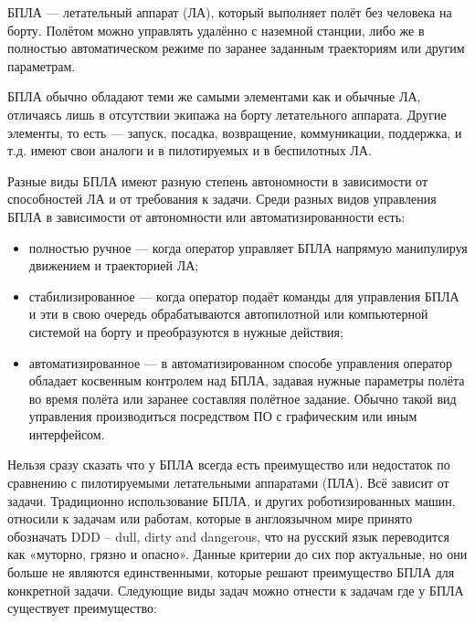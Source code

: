 \documentclass[specification,annotation]{itmo-student-thesis}
\begin{document}
БПЛА --- летательный аппарат (ЛА), который выполняет полёт без человека на борту.
Полётом можно управлять удалённо с наземной станции, либо же в полностью
автоматическом режиме по заранее заданным траекториям или другим
параметрам.\cite{austin-uas}

БПЛА обычно обладают теми же самыми элементами как и обычные ЛА, отличаясь лишь
в отсутствии экипажа на борту летательного аппарата. Другие элементы, то есть ---
запуск, посадка, возвращение, коммуникации, поддержка, и т.д. имеют свои аналоги
и в пилотируемых и в беспилотных ЛА.

Разные виды БПЛА имеют разную степень автономности в зависимости от способностей
ЛА и от требования к задачи. Среди разных видов управления БПЛА в зависимости от
автономности или автоматизированности есть\cite{douglas-intro-to-uas}:

\begin{itemize}
  \item полностью ручное --- когда оператор управляет БПЛА напрямую манипулируя
    движением и траекторией ЛА;
  \item стабилизированное --- когда оператор подаёт команды для управления БПЛА и
    эти в свою очередь обрабатываются автопилотной или компьютерной системой на
    борту и преобразуются в нужные действия;
  \item автоматизированное --- в автоматизированном способе управления оператор
    обладает косвенным контролем над БПЛА, задавая нужные параметры полёта во
    время полёта или заранее составляя полётное задание. Обычно такой вид
    управления производиться посредством ПО с графическим или иным интерфейсом.
\end{itemize}

Нельзя сразу сказать что у БПЛА всегда есть преимущество или недостаток по
сравнению с пилотируемыми летательными аппаратами (ПЛА). Всё зависит от задачи.
Традиционно использование БПЛА, и других роботизированных машин, относили к
задачам или работам, которые в англоязычном мире принято обозначать DDD -- dull,
dirty and dangerous, что на русский язык переводится как «муторно, грязно и
опасно». Данные критерии до сих пор актуальные, но они больше не являются
единственными, которые решают преимущество БПЛА для конкретной задачи. Следующие
виды задач можно отнести к задачам где у БПЛА существует преимущество:
\end{document}
